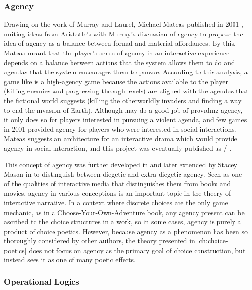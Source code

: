 \subsubsection{Agency}

Drawing on the work of Murray and Laurel, Michael Mateas published  in 2001 \citep{Mateas2001}, uniting ideas from Aristotle's  with Murray's discussion of agency to propose the idea of agency as a balance between formal and material affordances.
%
By this, Mateas meant that the player's sense of agency in an interactive experience depends on a balance between actions that the system allows them to do and agendas that the system encourages them to pursue.
%
According to this analysis, a game like  \citep{Quake} is a high-agency game because the actions available to the player (killing enemies and progressing through levels) are aligned with the agendas that the fictional world suggests (killing the otherworldly invaders and finding a way to end the invasion of Earth).
%
Although  may do a good job of providing agency, it only does so for players interested in pursuing a violent agenda, and few games in 2001 provided agency for players who were interested in social interactions.
%
Mateas suggests an architecture for an interactive drama which would provide agency in social interaction, and this project was eventually published as \facade/ \citep{Mateas2002b}.


This concept of agency was further developed in \citep{WardripFruin2009} and later extended by Stacey Mason in \citep{Mason2013} to distinguish between diegetic and extra-diegetic agency.
%
Seen as one of the qualities of interactive media that distinguishes them from books and movies, agency in various conceptions is an important topic in the theory of interactive narrative.
%
In a context where discrete choices are the only game mechanic, as in a Choose-Your-Own-Adventure book, any agency present can be ascribed to the choice structures in a work, so in some cases, agency is purely a product of choice poetics.
%
However, because agency as a phenomenon has been so thoroughly considered by other authors, the theory presented in \cref{ch:choice-poetics} does not focus on agency as the primary goal of choice construction, but instead sees it as one of many poetic effects.


\subsubsection{Operational Logics}

